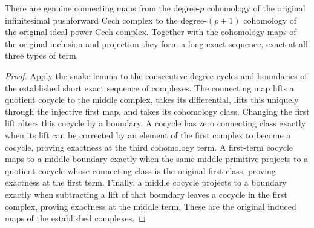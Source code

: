 \begin{corollary}
\label{cor:fibre-infinitesimal-ordered-cech-long-exact}
\leanok
There are genuine connecting maps from the degree-$p$ cohomology of
the original infinitesimal pushforward Cech complex to the degree-$(p+1)$
cohomology of the original ideal-power Cech complex. Together with the
cohomology maps of the original inclusion and projection they form a
long exact sequence, exact at all three types of term.
\end{corollary}
\begin{proof}
Apply the snake lemma to the consecutive-degree cycles and boundaries
of the established short exact sequence of complexes. The connecting
map lifts a quotient cocycle to the middle complex, takes its
differential, lifts this uniquely through the injective first map,
and takes its cohomology class. Changing the first lift alters this
cocycle by a boundary. A cocycle has zero connecting class exactly when
its lift can be corrected by an element of the first complex to become
a cocycle, proving exactness at the third cohomology term. A first-term
cocycle maps to a middle boundary exactly when the same middle
primitive projects to a quotient cocycle whose connecting class is
the original first class, proving exactness at the first term. Finally,
a middle cocycle projects to a boundary exactly when subtracting a lift
of that boundary leaves a cocycle in the first complex, proving
exactness at the middle term. These are the original induced maps of
the established complexes.
\end{proof}



